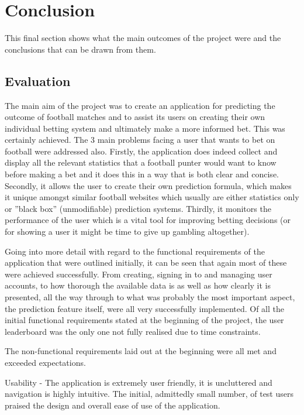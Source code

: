 \chapter{Conclusion}
\label{ch:conclusion}

This final section shows what the main outcomes of the project were and the conclusions that can be drawn from them.

\section{Evaluation}
\label{sec:evaluation_conclusion} 

The main aim of the project was to create an application for predicting the outcome of football matches and to assist its users on creating their own individual betting system and ultimately make a more informed bet. This was certainly achieved. The 3 main problems facing a user that wants to bet on football were addressed also. Firstly, the application does indeed collect and display all the relevant statistics that a football punter would want to know before making a bet and it does this in a way that is both clear and concise. Secondly, it allows the user to create their own prediction formula, which makes it unique amongst similar football websites which usually are either statistics only or ”black box” (unmodifiable) prediction systems. Thirdly, it monitors the performance of the user which is a vital tool for improving betting decisions (or for showing a user it might be time to give up gambling altogether).

Going into more detail with regard to the functional requirements of the application that were outlined initially, it can be seen that again most of these were achieved successfully.  From creating, signing in to and managing user accounts, to how thorough the available data is as well as how clearly it is presented, all the way through to what was probably the most important aspect, the prediction feature itself, were all very successfully implemented.  Of all the initial functional requirements stated at the beginning of the project, the user leaderboard was the only one not fully realised due to time constraints.

The non-functional requirements laid out at the beginning were all met and exceeded expectations. 

Usability - The application is extremely user friendly, it is uncluttered and navigation is highly intuitive. The initial, admittedly small number, of test users praised the design and overall ease of use of the application.

